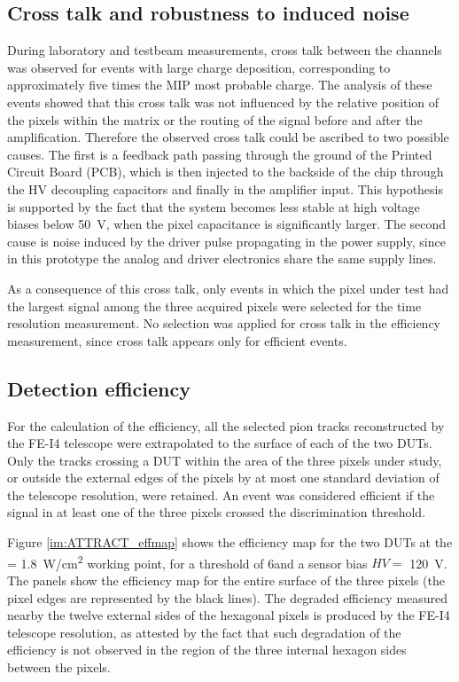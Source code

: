 		\subsection{Cross talk and robustness to induced noise}
		During laboratory and testbeam measurements, cross talk between the channels was observed for events with large charge deposition, corresponding to approximately five times the MIP most probable charge. The analysis of these events showed that this cross talk was not influenced by the relative position of the pixels within the matrix or the routing of the signal before and after the amplification. Therefore the observed cross talk could be ascribed to two possible causes. The first is a feedback path passing through the ground of the Printed Circuit Board (PCB), which is then injected to the backside of the chip through the HV decoupling capacitors and finally in the amplifier input. This hypothesis is supported by the fact that the system becomes less stable at high voltage biases below \SI{50}{\volt}, when the pixel capacitance is significantly larger. The second cause is noise induced by the driver pulse propagating in the power supply, since in this prototype the analog and driver electronics share the same supply lines.

		As a consequence of this cross talk, only  events in which the pixel under test had the largest signal among the three acquired pixels were selected for the time resolution measurement. No selection was applied for cross talk in the efficiency measurement, since cross talk appears only for efficient events.

		\subsection{Detection efficiency}
		For the calculation of the efficiency, all the selected pion tracks reconstructed by the FE-I4 telescope were extrapolated to the surface of each of the two DUTs. Only the tracks crossing a DUT within the  area of the three pixels under study, or outside the  external edges of the pixels by at most one standard deviation of the telescope resolution, were retained. An event was considered efficient if the signal in at least one of the three pixels crossed the discrimination threshold.

		Figure \ref{im:ATTRACT_effmap} shows the efficiency map for the two DUTs at the \power = \SI{1.8}{\watt/\centi\meter^2} working point, for a threshold of 6\noise and a sensor bias $HV = $ \SI{120}{\volt}. 
		The panels show the efficiency map for the entire surface of the three pixels (the pixel edges are represented by the black lines). The degraded efficiency measured nearby the twelve external sides of the hexagonal pixels is produced by the FE-I4 telescope resolution, as attested by the fact that such degradation of the efficiency is not observed in the region of the three internal hexagon sides between the pixels. 

